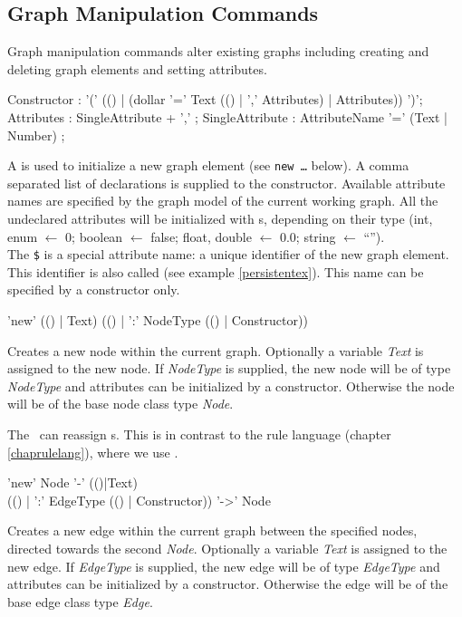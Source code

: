 \subsection{Graph Manipulation Commands}
\label{mani}
Graph manipulation commands alter existing graphs including creating and deleting graph elements and setting attributes.

\begin{rail}
  Constructor : '(' (() | (dollar '=' Text (() | ',' Attributes) | Attributes)) ')';
  Attributes : SingleAttribute + ',' ;
  SingleAttribute : AttributeName '=' (Text | Number) ; 
\end{rail}\indexmain{\texttt{\$}}
A  is used to initialize a new graph element (see \texttt{new \dots} below). A comma separated list of  declarations is supplied to the constructor. Available attribute names are specified by the graph model of the current working graph. All the undeclared attributes will be initialized with s, depending on their type (int, enum $\leftarrow$ 0; boolean $\leftarrow$ false; float, double $\leftarrow$ 0.0; string $\leftarrow$ ``'').\\
The \texttt{\$} is a special attribute name: a unique identifier of the new graph element. This identifier is also called  (see example \ref{persistentex}). This name can be specified by a constructor only.

\begin{rail}
  'new' (() | Text) (() | ':' NodeType (() | Constructor))
\end{rail}
Creates a new node within the current graph. Optionally a variable \emph{Text} is assigned to the new node. If \emph{NodeType} is supplied, the new node will be of type \emph{NodeType} and attributes can be initialized by a constructor. Otherwise the node will be of the base node class type \emph{Node}.
\begin{note}
The \GrShell\ can reassign s. 
This is in contrast to the rule language (chapter \ref{chaprulelang}), where we use \emph{}.
\end{note}

\begin{rail}
  'new' Node '-' (()|Text) \\ (() | ':' EdgeType (() | Constructor)) '->' Node
\end{rail}
Creates a new edge within the current graph between the specified nodes, directed towards the second \emph{Node}. Optionally a variable \emph{Text} is assigned to the new edge. If \emph{EdgeType} is supplied, the new edge will be of type \emph{EdgeType} and attributes can be initialized by a constructor. Otherwise the edge will be of the base edge class type \emph{Edge}.

